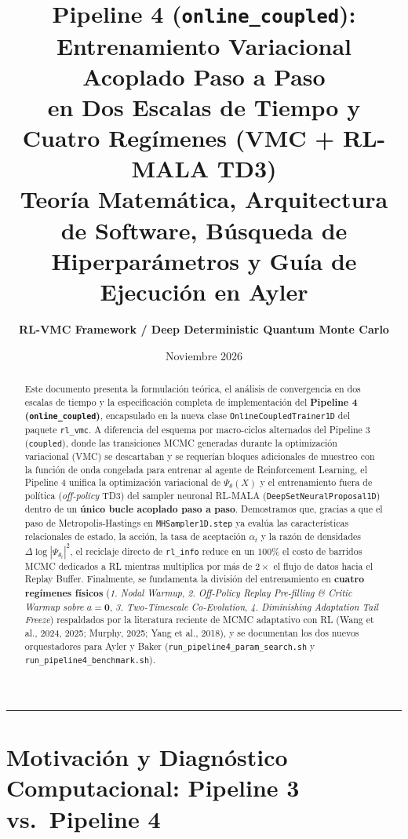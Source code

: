 \documentclass[10pt,a4paper]{article}
\title{\textbf{\Large Pipeline 4 (\texttt{online\_coupled}): Entrenamiento Variacional Acoplado Paso a Paso\\
en Dos Escalas de Tiempo y Cuatro Reg\'imenes (VMC + RL-MALA TD3)}\\
\vspace{0.2cm}
\large Teor\'ia Matem\'atica, Arquitectura de Software, B\'usqueda de Hiperpar\'ametros y Gu\'ia de Ejecuci\'on en Ayler}
\author{\textbf{RL-VMC Framework / Deep Deterministic Quantum Monte Carlo}}
\date{Noviembre 2026}
\begin{document}
\maketitle

\begin{abstract}
Este documento presenta la formulaci\'on te\'orica, el an\'alisis de convergencia en dos escalas de tiempo y la especificaci\'on completa de implementaci\'on del \textbf{Pipeline 4 (\texttt{online\_coupled})}, encapsulado en la nueva clase \texttt{OnlineCoupledTrainer1D} del paquete \texttt{rl\_vmc}. A diferencia del esquema por macro-ciclos alternados del Pipeline 3 (\texttt{coupled}), donde las transiciones MCMC generadas durante la optimizaci\'on variacional (VMC) se descartaban y se requer\'ian bloques adicionales de muestreo con la funci\'on de onda congelada para entrenar al agente de Reinforcement Learning, el Pipeline 4 unifica la optimizaci\'on variacional de $\Psi_\theta(X)$ y el entrenamiento fuera de pol\'itica (\textit{off-policy} TD3) del sampler neuronal RL-MALA (\texttt{DeepSetNeuralProposal1D}) dentro de un \textbf{\'unico bucle acoplado paso a paso}. Demostramos que, gracias a que el paso de Metropolis-Hastings en \texttt{MHSampler1D.step} ya eval\'ua las caracter\'isticas relacionales de estado, la acci\'on, la tasa de aceptaci\'on $\alpha_t$ y la raz\'on de densidades $\Delta \log |\Psi_{\theta_t}|^2$, el reciclaje directo de \texttt{rl\_info} reduce en un $100\%$ el costo de barridos MCMC dedicados a RL mientras multiplica por m\'as de $2\times$ el flujo de datos hacia el Replay Buffer. Finalmente, se fundamenta la divisi\'on del entrenamiento en \textbf{cuatro reg\'imenes f\'isicos} (\textit{1. Nodal Warmup}, \textit{2. Off-Policy Replay Pre-filling \& Critic Warmup sobre $a=\bm{0}$}, \textit{3. Two-Timescale Co-Evolution}, \textit{4. Diminishing Adaptation Tail Freeze}) respaldados por la literatura reciente de MCMC adaptativo con RL (Wang et al., 2024, 2025; Murphy, 2025; Yang et al., 2018), y se documentan los dos nuevos orquestadores para Ayler y Baker (\texttt{run\_pipeline4\_param\_search.sh} y \texttt{run\_pipeline4\_benchmark.sh}).
\end{abstract}

\tableofcontents
\vspace{0.5cm}
\hrule
\vspace{0.5cm}

\section{Motivaci\'on y Diagn\'ostico Computacional: Pipeline 3 vs.\ Pipeline 4}
\end{document}
